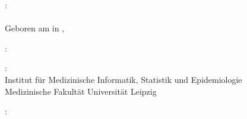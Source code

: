 \thispagestyle{empty}

\hfill

\vfill

\noindent{}: \\
\myName{}\\%
Geboren am {\mybirthday} in {\mybirthtown}, {\mybirthcountry}
\medskip

\noindent{}: \\
\emph{\myTitle}

\medskip

\noindent{}: \\
Institut für Medizinische Informatik, Statistik und Epidemiologie \\
Medizinische Fakultät
Universität Leipzig

\medskip


\medskip

\noindent{}: \\
\mySupervisor


